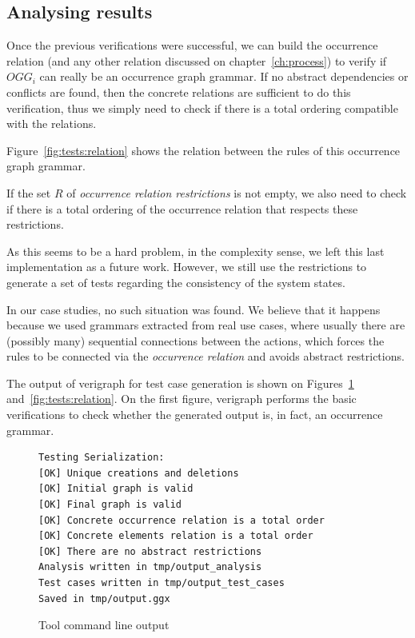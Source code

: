 \subsection{Analysing results}

Once the previous verifications were successful, we can build the occurrence relation (and any other relation discussed on chapter~\ref{ch:process}) to verify if $OGG_i$ can really be an occurrence graph grammar. If no abstract dependencies or conflicts are found, then the concrete relations are sufficient to do this verification, thus we simply need to check if there is a total ordering compatible with the relations.

\begin{example} Figure~\ref{fig:tests:relation} shows the relation between the rules of this occurrence graph grammar.
\end{example}

If the set $R$ of \emph{occurrence relation restrictions} is not empty, we also need to check if there is a total ordering of the occurrence relation that respects these restrictions.

As this seems to be a hard problem, in the complexity sense, we left this last implementation as a future work. However, we still use the restrictions to generate a set of tests regarding the consistency of the system states.

In our case studies, no such situation was found. We believe that it happens because we used grammars extracted from real use cases, where usually there are (possibly many) sequential connections between the actions, which forces the rules to be connected via the \emph{occurrence relation} and avoids abstract restrictions.

The output of verigraph for test case generation is shown on Figures~\ref{fig:tests:checklist} and~\ref{fig:tests:relation}. On the first figure, verigraph performs the basic verifications to check whether the generated output is, in fact, an occurrence grammar.

\begin{figure}[!ht]
\caption{Tool command line output}
\begin{verbatim}
Testing Serialization:
[OK] Unique creations and deletions
[OK] Initial graph is valid
[OK] Final graph is valid
[OK] Concrete occurrence relation is a total order
[OK] Concrete elements relation is a total order
[OK] There are no abstract restrictions
Analysis written in tmp/output_analysis
Test cases written in tmp/output_test_cases
Saved in tmp/output.ggx
\end{verbatim}
  \label{fig:tests:checklist}
\end{figure}

